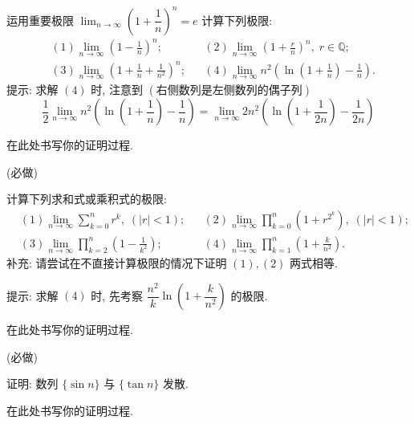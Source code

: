 \documentclass[answers, 10pt]{exam}
\begin{document}
\begin{questions}
	运用重要极限
	$
	\displaystyle \lim_{n\to\infty} \left(1+\dfrac1{n}\right)^n = e
	$
	计算下列极限: \vspace{-0.5ex}
	$$
	\begin{aligned}
		& (1) \lim_{n\to\infty} \left(1-\frac1{n}\right)^n;
		&&(2) \lim_{n\to\infty} \left(1+\frac{r}{n}\right)^n,\; r\in\mathbb{Q}; \\
		& (3) \lim_{n\to\infty} \left(1+\frac1{n}+\frac1{n^2}\right)^n;
		&&(4) \lim_{n\to\infty} n^2\left(\ln\left(1+\frac1{n}\right)-\frac1{n}\right).
	\end{aligned} 
	$$
	提示: 求解 $(4)$ 时, 注意到 $(\text{右侧数列是左侧数列的偶子列})$
	$$
	\frac1{2} \lim_{n\to\infty} n^2\left(\ln\left(1+\frac1{n}\right)-\frac1{n}\right) = \lim_{n\to\infty} 2n^2\left(\ln\left(1+\frac1{2n}\right)-\frac1{2n}\right)
	$$ \vspace{-5ex}
	\begin{solution}
		在此处书写你的证明过程.
	\end{solution}
	
	 (必做)
	
	计算下列求和式或乘积式的极限:
	$$
	\begin{aligned}
		& (1) \lim_{n\to\infty} \sum_{k=0}^{n} r^k,\; (|r|<1);
		&&(2) \lim_{n\to\infty} \prod_{k=0}^{n} \left(1+r^{2^k}\right),\; (|r|<1); \\
		& (3) \lim_{n\to\infty} \prod_{k=2}^{n} \left(1-\frac{1}{k^2}\right);
		&&(4) \lim_{n\to\infty} \prod_{k=1}^{n} \left(1+\frac{k}{n^2}\right).
	\end{aligned}
	$$
	补充: 请尝试在不直接计算极限的情况下证明 $(1),(2)$ 两式相等.
	
	\medskip
	提示: 求解 $(4)$ 时, 先考察 $\dfrac{n^2}{k}\ln\left(1+\dfrac{k}{n^2}\right)$ 的极限.
	\begin{solution}
		在此处书写你的证明过程.
	\end{solution}
	
	 (必做)
	
	证明: 数列 $\{\sin n\}$ 与 $\{\tan n\}$ 发散.
	
	\begin{solution}
		在此处书写你的证明过程.
	\end{solution}
	
\end{questions}
\end{document}
